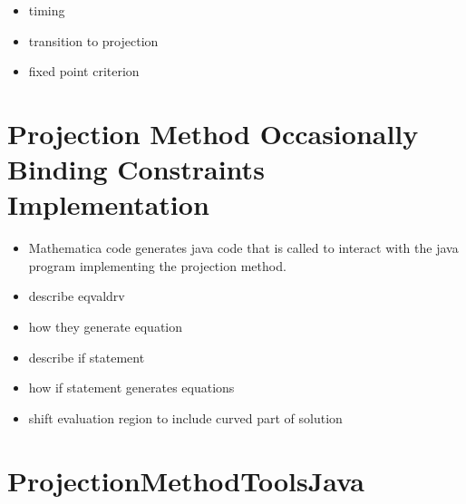 \documentclass[12pt]{article}
\begin{document}
\begin{itemize}
\item timing
\item transition to projection
\item fixed point criterion
\end{itemize}
\section{Projection Method Occasionally Binding Constraints Implementation}
\label{sec:proj-meth-occass}
\begin{itemize}
\item Mathematica code generates java code that is called to interact with the java program implementing the projection method.
\item describe eqvaldrv
\item how they generate equation
\item describe if statement
\item how if statement generates equations
\item shift evaluation region to include curved part of solution
\end{itemize}


\appendix
\section{ProjectionMethodToolsJava}
\label{sec:proj}



\end{document}
